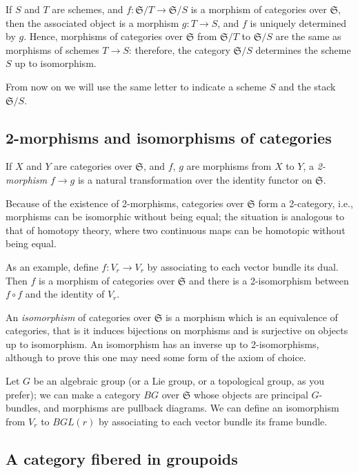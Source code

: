 \documentclass[12pt]{memoir}
\begin{document}
If $S$ and $T$ are schemes, and $f\colon \mathfrak{S}/T \to \mathfrak{S}/S$ is a morphism of categories over $\mathfrak{S}$, then the associated object is a morphism $g\colon T \to S$, and $f$ is uniquely determined by $g$. Hence, morphisms of categories over $\mathfrak{S}$ from $\mathfrak{S}/T$ to $\mathfrak{S}/S$ are the same as morphisms of schemes $T \to S$: therefore, the category $\mathfrak{S}/S$ determines the scheme $S$ up to isomorphism.

From now on we will use the same letter to indicate a scheme $S$ and the stack $\mathfrak{S}/S$.

\subsection{2-morphisms and isomorphisms of categories}

If $X$ and $Y$ are categories over $\mathfrak{S}$, and $f$, $g$ are morphisms from $X$ to $Y$, a \emph{2-morphism} $f \to g$ is a natural transformation over the identity functor on $\mathfrak{S}$.


Because of the existence of 2-morphisms, categories over $\mathfrak{S}$ form a 2-category, i.e., morphisms can be isomorphic without being equal; the situation is analogous to that of homotopy theory, where two continuous maps can be homotopic without being equal.

As an example, define $f\colon V_r \to V_r$ by associating to each vector bundle its dual. Then $f$ is a morphism of categories over $\mathfrak{S}$ and there is a 2-isomorphism between $f \circ f$ and the identity of $V_r$.

An \emph{isomorphism} of categories over $\mathfrak{S}$ is a morphism which is an equivalence of categories, that is it induces bijections on morphisms and is surjective on objects up to isomorphism. An isomorphism has an inverse up to 2-isomorphisms, although to prove this one may need some form of the axiom of choice.

Let $G$ be an algebraic group (or a Lie group, or a topological group, as you prefer); we can make a category $BG$ over $\mathfrak{S}$ whose objects are principal $G$-bundles, and morphisms are pullback diagrams. We can define an isomorphism from $V_r$ to $BGL(r)$ by associating to each vector bundle its frame bundle.

\subsection{A category fibered in groupoids}
\end{document}

